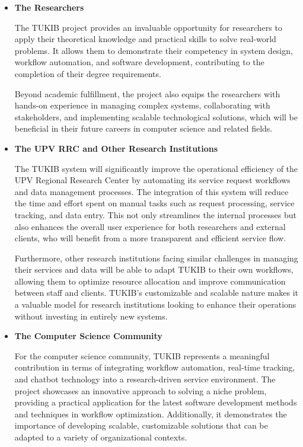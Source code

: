 \begin{itemize}
	
\item \textbf{The Researchers}

\subitem The TUKIB project provides an invaluable opportunity for researchers to apply their theoretical knowledge and practical skills to solve real-world problems. It allows them to demonstrate their competency in system design, workflow automation, and software development, contributing to the completion of their degree requirements.
	
\subitem Beyond academic fulfillment, the project also equips the researchers with hands-on experience in managing complex systems, collaborating with stakeholders, and implementing scalable technological solutions, which will be beneficial in their future careers in computer science and related fields.\newline

\item \textbf{The UPV RRC and Other Research Institutions}

\subitem The TUKIB system will significantly improve the operational efficiency of the UPV Regional Research Center by automating its service request workflows and data management processes. The integration of this system will reduce the time and effort spent on manual tasks such as request processing, service tracking, and data entry. This not only streamlines the internal processes but also enhances the overall user experience for both researchers and external clients, who will benefit from a more transparent and efficient service flow.

\subitem Furthermore, other research institutions facing similar challenges in managing their services and data will be able to adapt TUKIB to their own workflows, allowing them to optimize resource allocation and improve communication between staff and clients. TUKIB’s customizable and scalable nature makes it a valuable model for research institutions looking to enhance their operations without investing in entirely new systems.\newline

\item \textbf{The Computer Science Community}

\subitem For the computer science community, TUKIB represents a meaningful contribution in terms of integrating workflow automation, real-time tracking, and chatbot technology into a research-driven service environment. The project showcases an innovative approach to solving a niche problem, providing a practical application for the latest software development methods and techniques in workflow optimization. Additionally, it demonstrates the importance of developing scalable, customizable solutions that can be adapted to a variety of organizational contexts.


\end{itemize}
